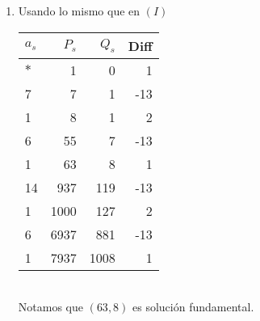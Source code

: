 \begin{sol}
\begin{enumerate}[label = (\roman*)]
		\item Usando lo mismo que en $(I)$\\
		      \begin{tabular}{| l | r | r | r |}
			      \hline
			      $a_s$ & $P_s$ & $Q_s$ & Diff \\
			      \hline\hline
			      $*$   & 1     & 0     & 1    \\
			      \hline
			      7     & 7     & 1     & -13  \\
			      \hline
			      1     & 8     & 1     & 2    \\
			      \hline
			      6     & 55    & 7     & -13  \\
			      \hline
			      1     & 63    & 8     & 1    \\
			      \hline
			      14    & 937   & 119   & -13  \\
			      \hline
			      1     & 1000  & 127   & 2    \\
			      \hline
			      6     & 6937  & 881   & -13  \\
			      \hline
			      1     & 7937  & 1008  & 1    \\
			      \hline
		      \end{tabular}\\
		      Notamos que $(63,8)$ es solución fundamental.
	\end{enumerate}
\end{sol}


